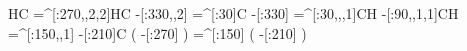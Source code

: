                  HC%
    =^[:270,,2,2]HC%
       -[:330,,2]%
          =^[:30]C%
          -[:330]%
      =^[:30,,,1]CH%
      -[:90,,1,1]CH%
      =^[:150,,1]%
          -[:210]C%
                    (
              -[:270]\phantom{C}%
                    )
         =^[:150]%
                    (
              -[:210]\phantom{C}%
                    )